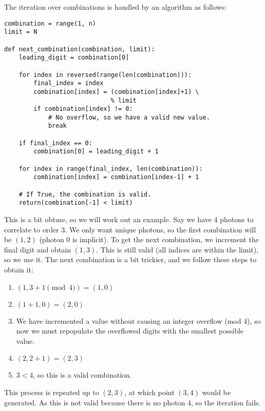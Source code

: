 The iteration over combinations is handled by an algorithm as follows:
\lstset{language=Python}
\begin{lstlisting}
combination = range(1, n)
limit = N

def next_combination(combination, limit):
    leading_digit = combination[0]
    
    for index in reversed(range(len(combination))):
        final_index = index
        combination[index] = (combination[index]+1) \
                             % limit
        if combination[index] != 0:
            # No overflow, so we have a valid new value.
            break
    
    if final_index == 0:
        combination[0] = leading_digit + 1
       
    for index in range(final_index, len(combination)):
        combination[index] = combination[index-1] + 1
    
    # If True, the combination is valid. 
    return(combination[-1] < limit) 
\end{lstlisting}
This is a bit obtuse, so we will work out an example. Say we have 4 photons to correlate to order 3. We only want unique photons, so the first combination will be $(1,2)$ (photon 0 is implicit). To get the next combination, we increment the final digit and obtain $(1,3)$. This is still valid (all indices are within the limit), so we use it. The next combination is a bit trickier, and we follow these steps to obtain it:
\begin{enumerate}
\item $(1,3+1 \pmod{4}) = (1, 0)$
\item $(1+1, 0) = (2, 0)$
\item We have incremented a value without causing an integer overflow (mod 4), so now we must repopulate the overflowed digits with the smallest possible value.
\item $(2, 2+1) = (2, 3)$
\item $3 < 4$, so this is a valid combination.
\end{enumerate}
This process is repeated up to $(2,3)$, at which point $(3,4)$ would be generated. As this is not valid because there is no photon 4, so the iteration fails.

